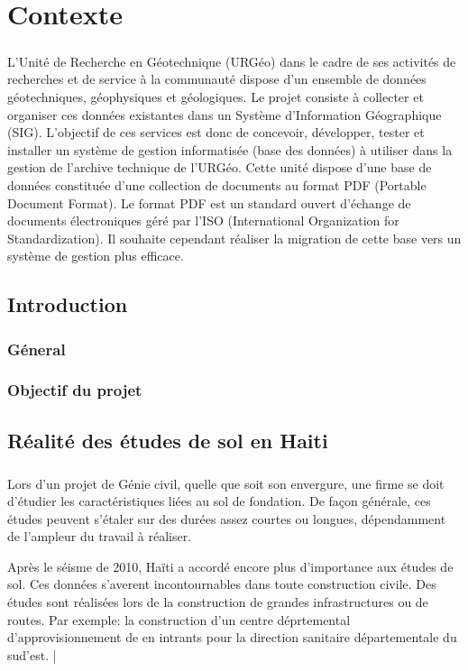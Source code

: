 \chapter{Contexte}
\paragraph{}
L’Unité de Recherche en Géotechnique (URGéo) dans le cadre de ses activités de recherches et de service à
la communauté dispose d’un ensemble de données géotechniques, géophysiques et géologiques. Le projet
consiste à collecter et organiser ces données existantes dans un Système d’Information Géographique (SIG).
L’objectif de ces services est donc de concevoir, développer, tester et installer un système de gestion
informatisée (base des données) à utiliser dans la gestion de l’archive technique de l’URGéo. Cette unité
dispose d'une base de données constituée d’une collection de documents au format PDF (Portable Document
Format). Le format PDF est un standard ouvert d'échange de documents électroniques géré par l’ISO
(International Organization for Standardization). Il souhaite cependant réaliser la migration de cette base vers
un système de gestion plus efficace.
    \section{Introduction}
        \subsection{Géneral}
        \lipsum[1]
        \subsection{Objectif du projet}
        \lipsum[1]
    \section{Réalité des études de sol en Haiti}
    \paragraph{}
    Lors d'un projet de Génie civil, quelle que soit son envergure, une firme se doit d'étudier 
    les caractéristiques liées au sol de fondation. De façon générale, ces études peuvent s'étaler 
    sur des durées assez courtes ou longues, dépendamment de l'ampleur du travail à réaliser.
    \par
    Après le séisme de 2010, Haïti a accordé encore plus d'importance aux études de sol. Ces données s'averent 
    incontournables dans toute construction civile. Des études sont réalisées lors de la construction de grandes infrastructures ou de routes.
    Par exemple: la construction d'un centre déprtemental d'approvisionnement de en intrants pour la direction sanitaire 
    départementale du sud'est. \cite{realisation_geotechsol} |
    

